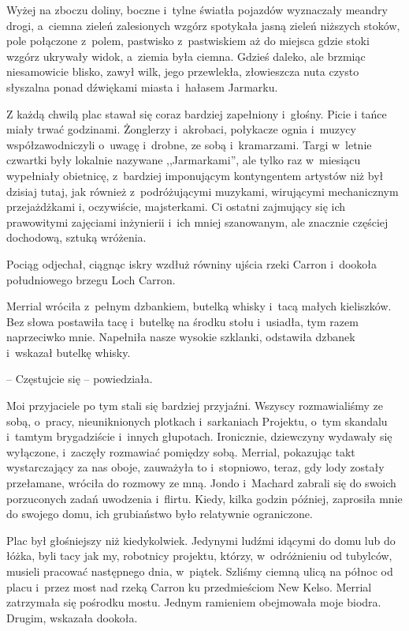 \documentclass[oneside,polish,11pt,sfheadings]{mwbk}
\begin{document}
Wyżej na zboczu doliny, boczne i~tylne światła pojazdów wyznaczały
meandry drogi, a~ciemna zieleń zalesionych wzgórz spotykała jasną zieleń
niższych stoków, pole połączone z~polem, pastwisko z~pastwiskiem aż do
miejsca gdzie stoki wzgórz ukrywały widok, a~ziemia była ciemna. Gdzieś
daleko, ale brzmiąc niesamowicie blisko, zawył wilk, jego przewlekła,
złowieszcza nuta czysto słyszalna ponad dźwiękami miasta i~hałasem
Jarmarku.

Z każdą chwilą plac stawał się coraz bardziej zapełniony i~głośny. Picie
i tańce miały trwać godzinami. Żonglerzy i~akrobaci, połykacze ognia i~muzycy współzawodniczyli o~uwagę i~drobne, ze sobą i~kramarzami. Targi w~letnie czwartki były lokalnie nazywane ,,Jarmarkami'', ale tylko raz w~miesiącu wypełniały obietnicę, z~bardziej imponującym kontyngentem
artystów niż był dzisiaj tutaj, jak również z~podróżującymi muzykami,
wirującymi mechanicznym przejażdżkami i, oczywiście, majsterkami. Ci
ostatni zajmujący się ich prawowitymi zajęciami inżynierii i~ich mniej
szanowanym, ale znacznie częściej dochodową, sztuką wróżenia.

Pociąg odjechał, ciągnąc iskry wzdłuż równiny ujścia rzeki Carron i~dookoła południowego brzegu Loch Carron.

Merrial wróciła z~pełnym dzbankiem, butelką whisky i~tacą małych
kieliszków. Bez słowa postawiła tacę i~butelkę na środku stołu i~usiadła, tym razem naprzeciwko mnie. Napełniła nasze wysokie szklanki,
odstawiła dzbanek i~wskazał butelkę whisky. 

-- Częstujcie się -- powiedziała.

Moi przyjaciele po tym stali się bardziej przyjaźni. Wszyscy
rozmawialiśmy ze sobą, o~pracy, nieuniknionych plotkach i~sarkaniach
Projektu, o~tym skandalu i~tamtym brygadziście i~innych głupotach.
Ironicznie, dziewczyny wydawały się wyłączone, i~zaczęły rozmawiać
pomiędzy sobą. Merrial, pokazując takt wystarczający za nas oboje,
zauważyła to i~stopniowo, teraz, gdy lody zostały przełamane, wróciła do
rozmowy ze mną. Jondo i~Machard zabrali się do swoich porzuconych zadań
uwodzenia i~flirtu. Kiedy, kilka godzin później, zaprosiła mnie do
swojego domu, ich grubiaństwo było relatywnie ograniczone.

Plac był głośniejszy niż kiedykolwiek. Jedynymi ludźmi idącymi do domu
lub do łóżka, byli tacy jak my, robotnicy projektu, którzy, w~odróżnieniu od tubylców, musieli pracować następnego dnia, w~piątek.
Szliśmy ciemną ulicą na północ od placu i~przez most nad rzeką Carron ku
przedmieściom New Kelso. Merrial zatrzymała się pośrodku mostu. Jednym
ramieniem obejmowała moje biodra. Drugim, wskazała dookoła.
\end{document}
